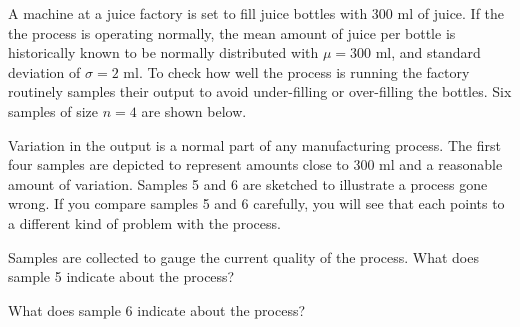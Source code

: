 \documentclass{ximera}
\begin{document}
\begin{exploration}\label{exp:OJ}
  A machine at a juice factory is set to fill juice bottles with 300 ml of juice.  If the the process is operating normally, the mean amount of juice per bottle is historically known to be normally distributed with $\mu=300$ ml, and standard deviation of $\sigma=2$ ml. To check how well the process is running the factory routinely samples their output to avoid under-filling or over-filling the bottles.  Six samples of size $n=4$ are shown below.

\begin{center}
      \end{center}

Variation in the output is a normal part of any manufacturing process.  The first four samples are depicted to represent amounts close to 300 ml and a reasonable amount of variation.  Samples 5 and 6 are sketched to illustrate a process gone wrong.  If you compare samples 5 and 6 carefully, you will see that each points to a different kind of problem with the process.

Samples are collected to gauge the current quality of the process.  What does sample 5 indicate about the process?

\begin{multipleChoice}
\end{multipleChoice}

What does sample 6 indicate about the process?

\begin{multipleChoice}
\end{multipleChoice}
 
\end{exploration}
\end{document}
